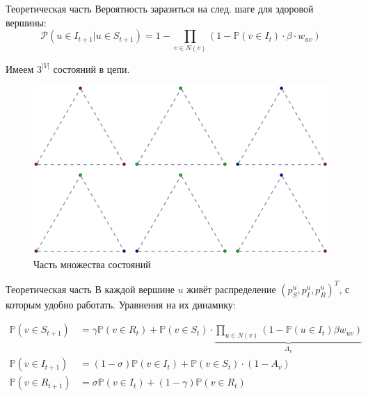 	\begin{frame}{Теоретическая часть}
		Вероятность заразиться на след. шаге для здоровой вершины:
		\begin{equation*}
			\mathcal{P}(u \in I_{t+1} | u \in S_{t+1}) = 1 - \prod\limits_{v \in N(v)} (1 - \mathbb{P}(v \in I_t) \cdot \beta \cdot w_{uv})
		\end{equation*}
		
		Имеем $ 3^{|V|} $ состояний в цепи.
		
		\begin{figure}
			\includegraphics[width=0.5\linewidth, keepaspectratio]{img/states_in_chain}
			\caption{Часть множества состояний}
		\end{figure}		
	
	\end{frame}

	\begin{frame}{Теоретическая часть}
		В каждой вершине $ u $ живёт распределение $ (p_S^u, p_I^u, p_R^u)^T $, с которым удобно работать. Уравнения на их динамику:
		
		\begin{align*}
			\mathbb{P}(v \in S_{t+1}) &= \gamma \mathbb{P}(v \in R_t) + \mathbb{P}(v \in S_t) \cdot \underbrace{\prod\limits_{u \in N(v)} (1 - \mathbb{P}(u \in I_t) \beta w_{uv})}_{A_v} \\
			\mathbb{P}(v \in I_{t+1}) &= (1 - \sigma) \mathbb{P}(v \in I_t) + \mathbb{P}(v \in S_t) \cdot (1 - A_v) \\
			\mathbb{P}(v \in R_{t+1}) &= \sigma \mathbb{P}(v \in I_t) + (1 - \gamma) \mathbb{P}(v \in R_t) 
		\end{align*}
				
		
	\end{frame}

